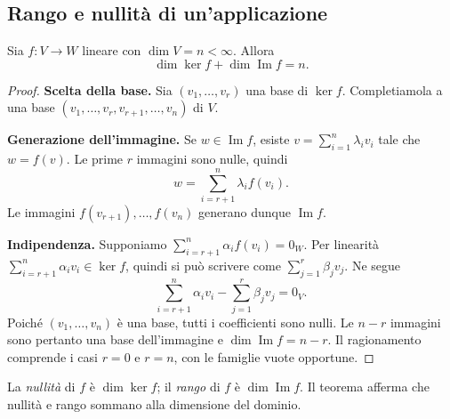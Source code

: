 \subsection{Rango e nullità di un'applicazione}
\begin{teorema}
\label{teo:dimensione-applicazione}
Sia $f:V\to W$ lineare con $\dim V=n<\infty$. Allora
\[
 \dim\ker f+\dim\operatorname{Im}f=n.
\]
\end{teorema}
\begin{proof}
\textbf{Scelta della base.} Sia $(v_1,\ldots,v_r)$ una base di $\ker f$. Completiamola a una base $(v_1,\ldots,v_r,v_{r+1},\ldots,v_n)$ di $V$.

\textbf{Generazione dell'immagine.} Se $w\in\operatorname{Im}f$, esiste $v=\sum_{i=1}^n\lambda_iv_i$ tale che $w=f(v)$. Le prime $r$ immagini sono nulle, quindi
\[
 w=\sum_{i=r+1}^n\lambda_if(v_i).
\]
Le immagini $f(v_{r+1}),\ldots,f(v_n)$ generano dunque $\operatorname{Im}f$.

\textbf{Indipendenza.} Supponiamo $\sum_{i=r+1}^n\alpha_if(v_i)=0_W$. Per linearità $\sum_{i=r+1}^n\alpha_iv_i\in\ker f$, quindi si può scrivere come $\sum_{j=1}^r\beta_jv_j$. Ne segue
\[
 \sum_{i=r+1}^n\alpha_iv_i-\sum_{j=1}^r\beta_jv_j=0_V.
\]
Poiché $(v_1,\ldots,v_n)$ è una base, tutti i coefficienti sono nulli. Le $n-r$ immagini sono pertanto una base dell'immagine e $\dim\operatorname{Im}f=n-r$. Il ragionamento comprende i casi $r=0$ e $r=n$, con le famiglie vuote opportune.
\end{proof}
\begin{definizione}
La \emph{nullità} di $f$ è $\dim\ker f$; il \emph{rango} di $f$ è $\dim\operatorname{Im}f$. Il teorema afferma che nullità e rango sommano alla dimensione del dominio.
\end{definizione}
